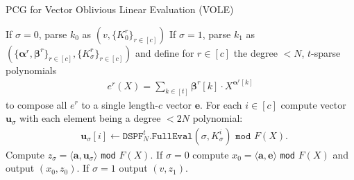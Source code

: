 \begin{specialconstruction}{PCG for Vector Oblivious Linear Evaluation (VOLE)}
\begin{algorithmic}[1]
\State If $\sigma=0$, parse $k_0$ as $(v, \{K_0^{r}\}_{r\in[c]})$
\State If $\sigma=1$, parse $k_1 $ as $(\{\boldsymbol{\alpha}^r, \boldsymbol{\beta}^r\}_{r\in[c]}, \{K_\sigma^{r}\}_{r\in[c]})$ and define for $r \in [c]$ the degree $< N$, $t$-sparse polynomials
\begin{align*}
e^r(X) = \sum_{k\in [t]} \boldsymbol{\beta}^r[k] \cdot X^{\boldsymbol{\alpha}^r[k]}
\end{align*}
to compose all $e^r$ to a single length-$c$ vector $\boldsymbol{e}$.
\State For each $i \in [c]$ compute vector $\boldsymbol{u}_\sigma$ with each element being a degree $< 2N$ polynomial:
\begin{align*}
& \boldsymbol{u}_\sigma[i] \leftarrow \texttt{DSPF}^{t}_{N}\texttt{.FullEval}(\sigma, K_\sigma^{i}) 
\texttt{ mod } F(X).
\end{align*}
\State Compute $z_\sigma  = \langle\boldsymbol{a},\boldsymbol{u}_\sigma\rangle$ \texttt{mod} $F(X)$.
\State If $\sigma=0$ compute $x_0 = \langle\boldsymbol{a},\boldsymbol{e}\rangle$ \texttt{mod} $F(X)$ and output $(x_0, z_0)$.
\State If $\sigma=1$ output $(v, z_1)$.
\end{algorithmic}
\end{specialconstruction}

\vspace{1em}

